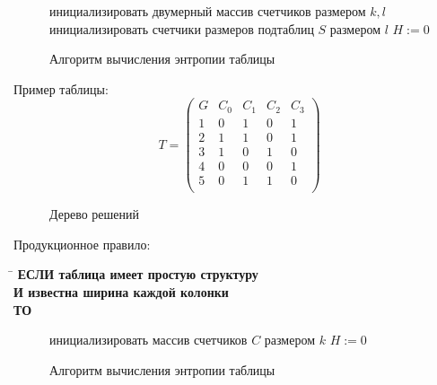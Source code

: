 \begin{figure}[H]
	\centering
	\begin{algorithm}[H]
		\SetAlgoLined
		\DontPrintSemicolon
		инициализировать двумерный массив счетчиков размером $k,l$\;
		инициализировать счетчики размеров подтаблиц $S$ размером $l$\;
		$H := 0$\;
	\end{algorithm}
	\caption{Алгоритм вычисления энтропии таблицы}\label{fig:alg-entro2}
\end{figure}

\begin{multicols}{2}
Пример таблицы:
$$
T = \left( \begin{array}{cc|c|cc}
G & C_0 & C_1 & C_2 & C_3 \\
1 & 0 & 1 & 0 & 1 \\
2 & 1 & 1 & 0 & 1 \\
3 & 1 & 0 & 1 & 0 \\
4 & 0 & 0 & 0 & 1 \\
5 & 0 & 1 & 1 & 0 \\
\end{array} \right)
$$

\begin{figure}[H]
	\centering
	\caption{Дерево решений}
\end{figure}
\end{multicols}

Продукционное правило:
\begin{tabbing}
	\hspace{4em}\=\kill
	\bf ЕСЛИ \> таблица имеет простую структуру \\ 
	\bf И \> известна ширина каждой колонки \\
	\bf ТО \> 
\end{tabbing} 

\begin{figure}[H]
	\centering
	\begin{algorithm}[H]
		\SetAlgoLined
		\DontPrintSemicolon
		инициализировать массив счетчиков $C$ размером $k$\;
		$H := 0$\;
	\end{algorithm}
	\caption{Алгоритм вычисления энтропии таблицы}\label{fig:alg-entro}
\end{figure}

